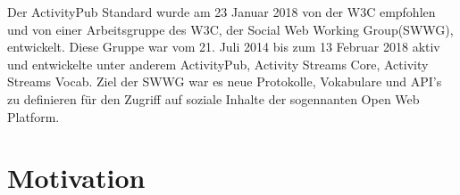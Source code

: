 {		
	Der ActivityPub\cite{activityPub} Standard wurde am 23 Januar 2018 von der W3C empfohlen und von einer Arbeitsgruppe des W3C, der Social Web Working Group(SWWG)\cite{socialWg,pushSocialWeb}, entwickelt. Diese Gruppe war vom 21. Juli 2014 bis zum 13 Februar 2018 aktiv\cite{socialWg} und entwickelte unter anderem ActivityPub, Activity Streams Core\cite{activityStreamsCore}, Activity Streams Vocab\cite{activityStreamsVocabulary}. Ziel der SWWG war es neue Protokolle, Vokabulare und API's zu definieren für den Zugriff auf soziale Inhalte der sogennanten Open Web Platform\cite{social-wg-charter}.\\
}

\section{Motivation}
\label{sec:Introduction:Motivation}
